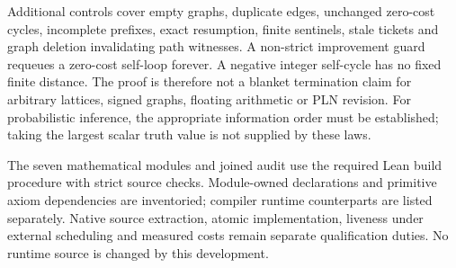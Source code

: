 \documentclass[11pt,a4paper]{article}
\begin{document}
Additional controls cover empty graphs, duplicate edges, unchanged zero-cost
cycles, incomplete prefixes, exact resumption, finite sentinels, stale tickets
and graph deletion invalidating path witnesses. A non-strict improvement guard
requeues a zero-cost self-loop forever. A negative integer self-cycle has no
fixed finite distance. The proof is therefore not a blanket termination
claim for arbitrary lattices, signed graphs, floating arithmetic or PLN
revision. For probabilistic inference, the appropriate information order
must be established; taking the largest scalar truth value is not supplied
by these laws.

The seven mathematical modules and joined audit use the required Lean build
procedure with strict source checks. Module-owned declarations and primitive
axiom dependencies are inventoried; compiler runtime counterparts are listed
separately. Native source extraction, atomic implementation, liveness under
external scheduling and measured costs remain separate qualification duties.
No runtime source is changed by this development.
\end{document}
